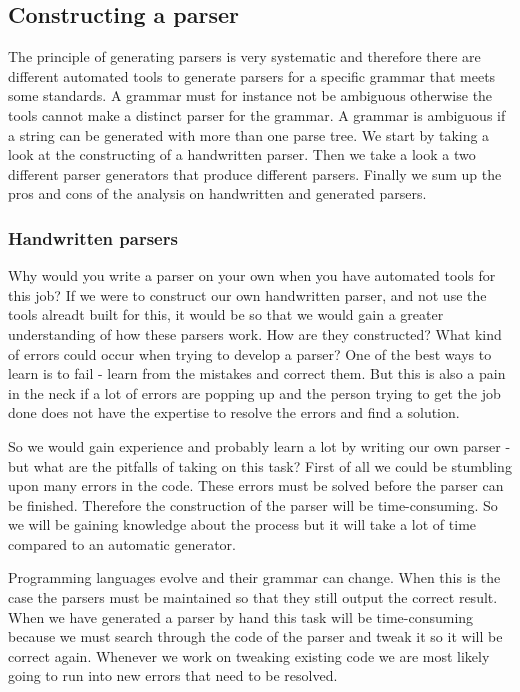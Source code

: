\subsection{Constructing a parser}
\label{subsec:constructingaparser}
The principle of generating parsers is very systematic and therefore there are
different automated tools to generate parsers for a specific grammar that meets
some standards. A grammar must for instance not be ambiguous otherwise the tools
cannot make a distinct parser for the grammar. A grammar is ambiguous if a
string can be generated with more than one parse tree. We start by taking a look
at the constructing of a handwritten parser. Then we take a look a two different
parser generators that produce different parsers. Finally we sum up the pros and
cons of the analysis on handwritten and generated parsers. 

\subsubsection{Handwritten parsers}
\label{subsec:handwrittenparsers}
Why would you write a parser on your own when you have automated tools for this
job? If we were to construct our own handwritten parser, and not use the tools
alreadt built for this, it would be so that we would gain a greater
understanding of how these parsers work. How are they constructed? What kind of
errors could occur when trying to develop a parser? One of the best ways to
learn is to fail - learn from the mistakes and correct them. But this is also a
pain in the neck if a lot of errors are popping up and the person trying to get
the job done does not have the expertise to resolve the errors and find a
solution.

So we would gain experience and probably learn a lot by writing our own parser -
but what are the pitfalls of taking on this task? First of all we could be
stumbling upon many errors in the code. These errors must be solved before the
parser can be finished. Therefore the construction of the parser will be
time-consuming. So we will be gaining knowledge about the process but it will
take a lot of time compared to an automatic generator.

Programming languages evolve and their grammar can change. When this is the case
the parsers must be maintained so that they still output the correct result.
When we have generated a parser by hand this task will be time-consuming because
we must search through the code of the parser and tweak it so it will be correct
again. Whenever we work on tweaking existing code we are most likely going to
run into new errors that need to be resolved. 

